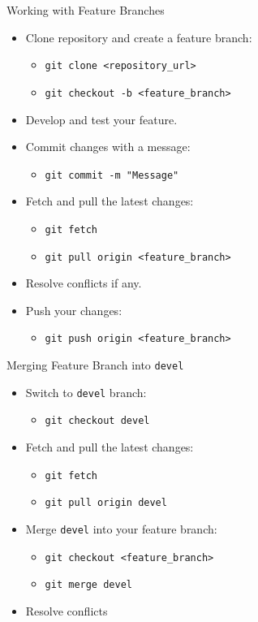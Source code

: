 \begin{frame}{Working with Feature Branches}
  \begin{itemize}
    \item Clone repository and create a feature branch:
      \begin{itemize}
        \item \texttt{git clone <repository\_url>}
        \item \texttt{git checkout -b <feature\_branch>}
      \end{itemize}
    \item Develop and test your feature.
    \item Commit changes with a message:
      \begin{itemize}
        \item \texttt{git commit -m "Message"}
      \end{itemize}
    \item Fetch and pull the latest changes:
      \begin{itemize}
        \item \texttt{git fetch}
        \item \texttt{git pull origin <feature\_branch>}
      \end{itemize}
    \item Resolve conflicts if any.
    \item Push your changes:
      \begin{itemize}
        \item \texttt{git push origin <feature\_branch>}
      \end{itemize}
  \end{itemize}
\end{frame}

\begin{frame}{Merging Feature Branch into \texttt{devel}}
  \begin{itemize}
    \item Switch to \texttt{devel} branch:
      \begin{itemize}
        \item \texttt{git checkout devel}
      \end{itemize}
    \item Fetch and pull the latest changes:
      \begin{itemize}
        \item \texttt{git fetch}
        \item \texttt{git pull origin devel}
      \end{itemize}
    \item Merge \texttt{devel} into your feature branch:
      \begin{itemize}
        \item \texttt{git checkout <feature\_branch>}
        \item \texttt{git merge devel}
      \end{itemize}
    \item Resolve conflicts
   \end{itemize}
\end{frame}
 
